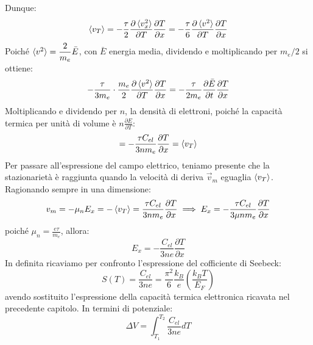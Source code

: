 \documentclass{book}
\begin{document}
            Dunque:
            $$\braket{v_{T}} = -\frac{\tau}{2} \frac{\partial \braket{v_{x} ^{2}}}{\partial T} \frac{\partial T}{\partial x} = - \frac{\tau}{6} \frac{\partial \braket{v ^{2}}}{\partial T} \frac{\partial T}{\partial x}$$
            Poiché $\braket{v^{2}} = \displaystyle  \frac{2}{m_{e}} \bar{E}$, con $\bar{E}$ energia media, dividendo e moltiplicando per $m_{e}/2$ si ottiene:
            $$-\frac{\tau}{3m_{e}} \cdot \frac{m_{e}}{2} \frac{\partial \braket{v^{2}}}{\partial T} \frac{\partial T}{\partial x} = - \frac{\tau}{2m_{e}} \frac{\partial \bar{E}}{\partial t} \frac{\partial T}{\partial x}$$
            Moltiplicando e dividendo per $n$, la densità di elettroni, poiché la capacità termica per unità di volume è $\displaystyle n \frac{\partial E}{\partial T}$:
            $$= - \frac{\tau C_{el}}{3n m_{e}} \frac{\partial T}{\partial x} = \braket{v_{T}}$$
            Per passare all'espressione del campo elettrico, teniamo presente che la stazionarietà è raggiunta quando la velocità di deriva $\vec{v}_{m}$ eguaglia $\braket{v_{T}}$. Ragionando sempre in una dimensione:
            $$v_{m} = - \mu_{n}E_{x} = -\braket{v_{T}} = \frac{\tau C_{el}}{3nm_{e}}\frac{\partial T}{\partial x} \implies E_{x} = - \frac{\tau  C_{el}}{3\mu n m_{e}} \frac{\partial T}{\partial x}$$
            poiché $\displaystyle \mu_{n} = \frac{e \tau}{m_{e}}$, allora:
            $$E_{x} = - \frac{C_{el}}{3ne} \frac{\partial T}{\partial x}$$
            In definita ricaviamo per confronto l'espressione del cofficiente di Seebeck:
            $$S(T) = \frac{C_{el}}{3ne} = \frac{\pi^{2}}{6} \frac{k_{B}}{e} (\frac{k_{B}T}{E_{F}})$$
            avendo sostituito l'espressione della capacità termica elettronica ricavata nel precedente capitolo. In termini di potenziale:
            $$\Delta V = \int_{T_{1}} ^{T_{2}} \frac{C_{el}}{3ne} dT$$
\end{document}

